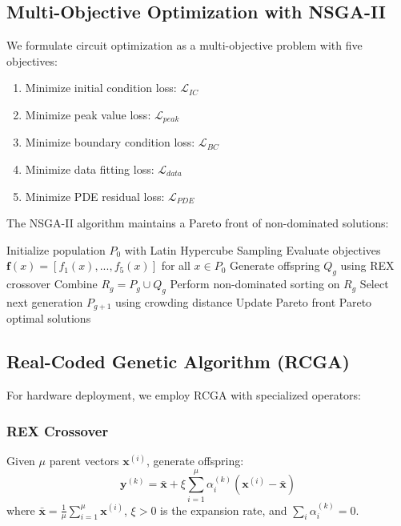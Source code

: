 \documentclass[11pt,a4paper,uplatex,dvipdfmx]{jsarticle}
\begin{document}
\subsection{Multi-Objective Optimization with NSGA-II}

We formulate circuit optimization as a multi-objective problem with five objectives:
\begin{enumerate}
    \item Minimize initial condition loss: $\mathcal{L}_{IC}$
    \item Minimize peak value loss: $\mathcal{L}_{peak}$
    \item Minimize boundary condition loss: $\mathcal{L}_{BC}$
    \item Minimize data fitting loss: $\mathcal{L}_{data}$
    \item Minimize PDE residual loss: $\mathcal{L}_{PDE}$
\end{enumerate}

The NSGA-II algorithm maintains a Pareto front of non-dominated solutions:

\begin{algorithm}
\caption{NSGA-II for Quantum Circuit Optimization}
\begin{algorithmic}[1]
\STATE Initialize population $P_0$ with Latin Hypercube Sampling
\STATE Evaluate objectives $\mathbf{f}(x) = [f_1(x), ..., f_5(x)]$ for all $x \in P_0$
    \STATE Generate offspring $Q_g$ using REX crossover
    \STATE Combine $R_g = P_g \cup Q_g$
    \STATE Perform non-dominated sorting on $R_g$
    \STATE Select next generation $P_{g+1}$ using crowding distance
    \STATE Update Pareto front
\ENDFOR
\RETURN Pareto optimal solutions
\end{algorithmic}
\end{algorithm}

\subsection{Real-Coded Genetic Algorithm (RCGA)}

For hardware deployment, we employ RCGA with specialized operators:

\subsubsection{REX Crossover}
Given $\mu$ parent vectors $\mathbf{x}^{(i)}$, generate offspring:
\begin{equation}
    \mathbf{y}^{(k)} = \bar{\mathbf{x}} + \xi \sum_{i=1}^{\mu} \alpha_i^{(k)} (\mathbf{x}^{(i)} - \bar{\mathbf{x}})
\end{equation}
where $\bar{\mathbf{x}} = \frac{1}{\mu}\sum_{i=1}^{\mu} \mathbf{x}^{(i)}$, $\xi > 0$ is the expansion rate, and $\sum_i \alpha_i^{(k)} = 0$.
\end{document}
